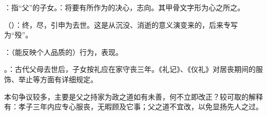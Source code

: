 {
\item {}：指“父”的子女。：将要有所作为的决心，志向。其甲骨文字形为心之所之。
\item {}（）：终，尽，引申为去世。这是从沉没、消逝的意义演变来的，后来专写为“殁”。
\item {}：（能反映个人品质的）行为，表现。
\item {}。：古代父母去世后，子女按礼应在家守丧三年。《礼记》、《仪礼》对居丧期间的服饰、举止等方面有详细规定。

本句争议较多，主要是父之持家为政之道如有未善，何不立即改正？较可取的解释有：孝子三年内应专心服丧，无暇顾及它事；父之道不宜改，以免显扬先人之过。
}
{}



